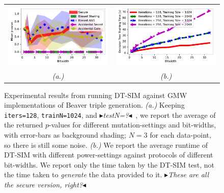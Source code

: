 \documentclass[acmlarge, manuscript, screen, review, anonymous, table]{acmart}
\newcommand{\toolname}{\textsc{DT-SIM}\xspace}
\newcommand{\mynote}[2]
    {{\color{red} \fbox{\bfseries\sffamily\scriptsize#1}
    {\small$\blacktriangleright$\textsf{\emph{#2}}$\blacktriangleleft$}}~}
\newcommand{\todo}[1]{\mynote{TODO}{#1}}
\begin{document}
\begin{figure}
  \centering
  \newcommand{\gsize}{.45\textwidth}
\begin{tabular}{c c}
    \includegraphics[width=\gsize]{graphs/security_beaver_triple_gen_gmw_128_1024.pdf} &
    \includegraphics[width=\gsize]{graphs/time_beaver_triple_gen_gmw_256_2048.pdf} \\
    \textit{(a.)} & \textit{(b.)}
\end{tabular}
\caption{Experimental results from running \toolname against GMW implementations of Beaver triple generation.
    \textit{(a.)} Keeping \texttt{iters=128}, \texttt{trainN=1024}, and \todo{testN=?}, we report the average of the returned $p$-values
      for different mutation-settings and bit-widths, with error-bars as background shading;
      $N=3$ for each data-point, so there is still some noise.
    \textit{(b.)} We report the average runtime of \toolname with different power-settings against protocols of different bit-widths.
      We report only the time taken by the \toolname test, not the time taken to \emph{generate} the data provided to it.
      \todo{These are all the secure version, right?}}
\label{fig:observations-detail}
\end{figure}
\end{document}
